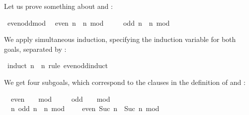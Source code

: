 \begin{isabellebody}
\begin{isamarkuptext}
  Let us prove something about  and :%
\end{isamarkuptext}%
\isamarkuptrue%
\isamarkupfalse%
\ even{}odd{}mod{}{}\isanewline
\ \ {}even\ n\ {}\ {}n\ mod\ {}\ {}\ {}{}{}\isanewline
\ \ {}odd\ n\ {}\ {}n\ mod\ {}\ {}\ {}{}{}%
\isadelimproof
%
\endisadelimproof
%
\isatagproof
%
\begin{isamarkuptxt}%
We apply simultaneous induction, specifying the induction variable
  for both goals, separated by :%
\end{isamarkuptxt}%
\isamarkuptrue%
\isamarkupfalse%
\ {}induct\ n\ \ n\ rule{}\ even{}odd{}induct{}%
\begin{isamarkuptxt}%
We get four subgoals, which correspond to the clauses in the
  definition of  and :
  \begin{isabelle}%
\ {}{}\ even\ {}\ {}\ {}{}\ mod\ {}\ {}\ {}{}\isanewline
\ {}{}\ odd\ {}\ {}\ {}{}\ mod\ {}\ {}\ {}{}\isanewline
\ {}{}\ {}n{}\ odd\ n\ {}\ {}n\ mod\ {}\ {}\ {}{}\ {}\ even\ {}Suc\ n{}\ {}\ {}Suc\ n\ mod\ {}\ {}\ {}{}\isanewline

\end{isabelle}
\end{isamarkuptxt}
\end{isabellebody}
